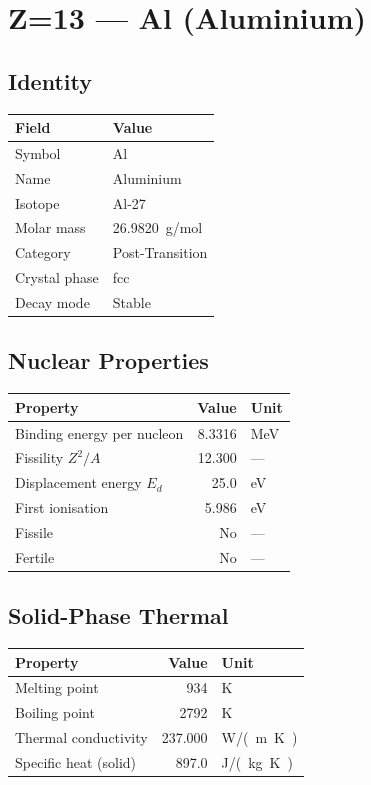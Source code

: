 \documentclass[11pt,a4paper]{article}
\begin{document}
\newpage

\section{Z=13 --- Al (Aluminium)}
\label{sec:Z13}

\subsection{Identity}
\begin{tabular}{ll}
  \toprule
  Field & Value \\
  \midrule
  Symbol & Al \\
  Name & Aluminium \\
  Isotope & Al-27 \\
  Molar mass & \SI{26.9820}{g/mol} \\
  Category & Post-Transition \\
  Crystal phase & fcc \\
  Decay mode & Stable \\
  \bottomrule
\end{tabular}

\subsection{Nuclear Properties}
\begin{tabular}{lrl}
  \toprule
  Property & Value & Unit \\
  \midrule
  Binding energy per nucleon & 8.3316 & \si{MeV} \\
  Fissility $Z^2/A$ & 12.300 & --- \\
  Displacement energy $E_d$ & 25.0 & \si{eV} \\
  First ionisation & 5.986 & \si{eV} \\
  Fissile & No & --- \\
  Fertile & No & --- \\
  \bottomrule
\end{tabular}

\subsection{Solid-Phase Thermal}
\begin{tabular}{lrl}
  \toprule
  Property & Value & Unit \\
  \midrule
  Melting point & 934 & \si{K} \\
  Boiling point & 2792 & \si{K} \\
  Thermal conductivity & 237.000 & \si{W/(m.K)} \\
  Specific heat (solid) & 897.0 & \si{J/(kg.K)} \\
  \bottomrule
\end{tabular}
\end{document}
